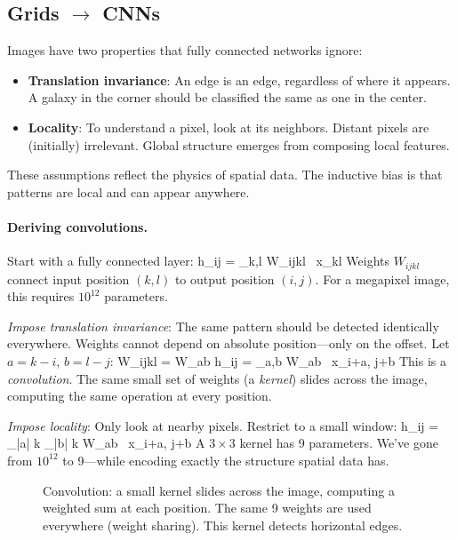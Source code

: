 \documentclass[11pt]{article}
\begin{document}
\subsection{Grids $\to$ CNNs}

Images have two properties that fully connected networks ignore:
\begin{itemize}
    \item \textbf{Translation invariance}: An edge is an edge, regardless of where it appears. A galaxy in the corner should be classified the same as one in the center.
    \item \textbf{Locality}: To understand a pixel, look at its neighbors. Distant pixels are (initially) irrelevant. Global structure emerges from composing local features.
\end{itemize}
These assumptions reflect the physics of spatial data. The inductive bias is that patterns are local and can appear anywhere.

\paragraph{Deriving convolutions.} Start with a fully connected layer:
\beq
h_{ij} = \sum_{k,l} W_{ijkl} \, x_{kl}
\eeq
Weights $W_{ijkl}$ connect input position $(k,l)$ to output position $(i,j)$. For a megapixel image, this requires $10^{12}$ parameters.

\emph{Impose translation invariance}: The same pattern should be detected identically everywhere. Weights cannot depend on absolute position---only on the offset. Let $a = k - i$, $b = l - j$:
\beq
W_{ijkl} = W_{ab} \quad \Rightarrow \quad h_{ij} = \sum_{a,b} W_{ab} \, x_{i+a, j+b}
\eeq
This is a \emph{convolution}. The same small set of weights (a \emph{kernel}) slides across the image, computing the same operation at every position.

\emph{Impose locality}: Only look at nearby pixels. Restrict to a small window:
\beq
h_{ij} = \sum_{|a| \leq k} \sum_{|b| \leq k} W_{ab} \, x_{i+a, j+b}
\eeq
A $3 \times 3$ kernel has 9 parameters. We've gone from $10^{12}$ to 9---while encoding exactly the structure spatial data has.

\begin{figure}[h]
\centering

\caption{Convolution: a small kernel slides across the image, computing a weighted sum at each position. The same 9 weights are used everywhere (weight sharing). This kernel detects horizontal edges.}
\label{fig:convolution}
\end{figure}
\end{document}
